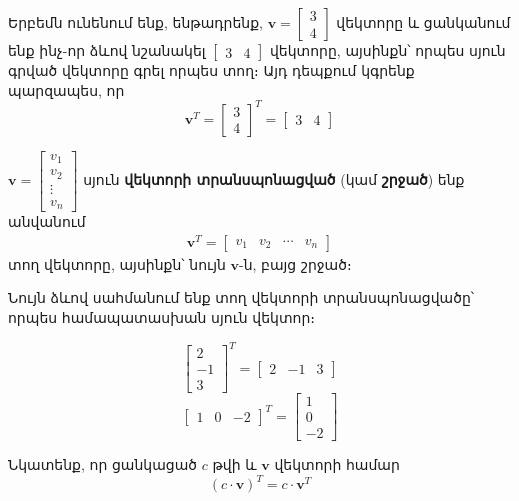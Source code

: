Երբեմն ունենում ենք, ենթադրենք, $\mathbf{v}=\begin{bmatrix}
    3 \\ 4
\end{bmatrix}$ վեկտորը և ցանկանում ենք ինչ-որ ձևով նշանակել $\begin{bmatrix}
    3 & 4
\end{bmatrix}$ վեկտորը, այսինքն՝ որպես սյուն գրված վեկտորը գրել որպես տող։ Այդ դեպքում կգրենք պարզապես, որ
\[
\mathbf{v}^T = \begin{bmatrix}
    3 \\ 4
\end{bmatrix}^T = \begin{bmatrix}
    3 & 4
\end{bmatrix}
\]

\begin{definition}
\( \mathbf{v} = \begin{bmatrix} v_1 \\ v_2 \\ \vdots \\ v_n \end{bmatrix} \) սյուն \textbf{վեկտորի տրանսպոնացված} (կամ \textbf{շրջած}) ենք անվանում
\begin{align*}
\mathbf{v}^T = \begin{bmatrix} v_1 & v_2 & \cdots & v_n \end{bmatrix}
\end{align*}
տող վեկտորը, այսինքն՝ նույն $\mathbf{v}$-ն, բայց շրջած։
\end{definition}
Նույն ձևով սահմանում ենք տող վեկտորի տրանսպոնացվածը՝ որպես համապատասխան սյուն վեկտոր։ 

\begin{example}
 \[
    \begin{bmatrix} 2 \\ -1 \\ 3 \end{bmatrix}^T = \begin{bmatrix} 2 & -1 & 3 \end{bmatrix}
    \]
    \[
    \begin{bmatrix} 1 & 0 & -2 \end{bmatrix}^T = \begin{bmatrix} 1 \\ 0 \\ -2 \end{bmatrix}
    \]
\end{example}

Նկատենք, որ ցանկացած $c$ թվի և $\mathbf{v}$ վեկտորի համար 
\[
(c \cdot \mathbf{v})^T = c \cdot \mathbf{v}^T 
\]

